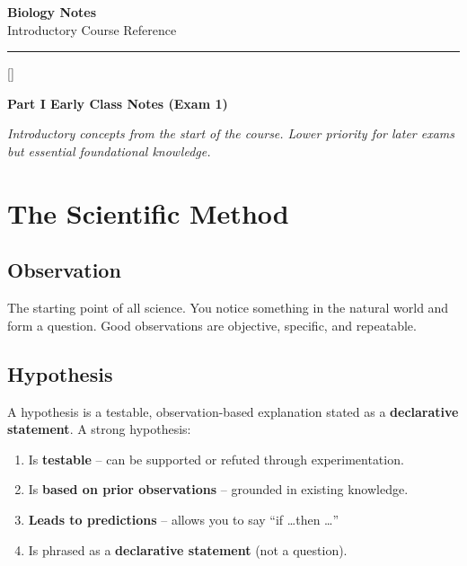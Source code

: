 \documentclass[11pt, letterpaper]{article}
\newcommand{\greensections}{%
  \titleformat{\section}{\large\bfseries\color{sectiongreen}}{}{0em}{}[\color{sectiongreen}\titlerule]%
  \titleformat{\subsection}{\normalsize\bfseries\color{sectiongreen!80!black}}{}{0em}{}%
}
\newcommand{\partbanner}[3]{%
  \begin{tcolorbox}[colback=#1, colframe=#2, boxrule=1.2pt, arc=4pt,
    left=8pt, right=8pt, top=6pt, bottom=6pt]
    \begin{center}{\LARGE\bfseries #3}\end{center}
  \end{tcolorbox}%
}
\begin{document}
\begin{center}
  {\Huge\bfseries Biology Notes}\\[6pt]
  {\large Introductory Course Reference}\\[4pt]
  \rule{\textwidth}{0.8pt}
\end{center}

\vspace{8pt}
\tableofcontents
\newpage

\greensections
{}
\partbanner{part2bg}{sectiongreen}{Part I \quad Early Class Notes \textnormal{\small(Exam 1)}}

\vspace{6pt}
\begin{center}\small\itshape
  Introductory concepts from the start of the course.
  Lower priority for later exams but essential foundational knowledge.
\end{center}
\vspace{4pt}

\section*{The Scientific Method}

\subsection*{Observation}
The starting point of all science. You notice something in the natural world and form a question. Good observations are objective, specific, and repeatable.

\subsection*{Hypothesis}
A hypothesis is a testable, observation-based explanation stated as a \textbf{declarative statement}. A strong hypothesis:
\begin{enumerate}[noitemsep]
  \item Is \textbf{testable} -- can be supported or refuted through experimentation.
  \item Is \textbf{based on prior observations} -- grounded in existing knowledge.
  \item \textbf{Leads to predictions} -- allows you to say ``if \ldots then \ldots''
  \item Is phrased as a \textbf{declarative statement} (not a question).
\end{enumerate}
\end{document}
